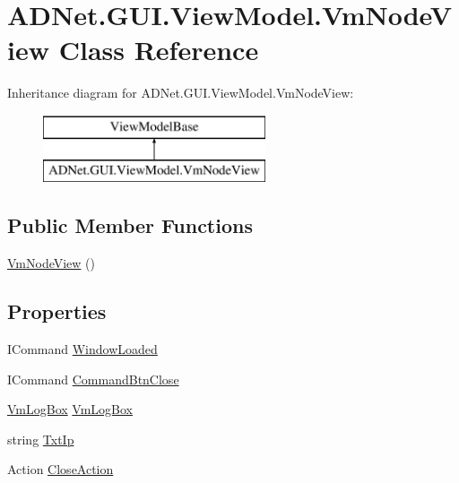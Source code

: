 \hypertarget{class_a_d_net_1_1_g_u_i_1_1_view_model_1_1_vm_node_view}{}\section{A\+D\+Net.\+G\+U\+I.\+View\+Model.\+Vm\+Node\+View Class Reference}
\label{class_a_d_net_1_1_g_u_i_1_1_view_model_1_1_vm_node_view}
Inheritance diagram for A\+D\+Net.\+G\+U\+I.\+View\+Model.\+Vm\+Node\+View\+:\begin{figure}[H]
\begin{center}
\leavevmode
\includegraphics[height=2.000000cm]{class_a_d_net_1_1_g_u_i_1_1_view_model_1_1_vm_node_view}
\end{center}
\end{figure}
\subsection*{Public Member Functions}
\begin{DoxyCompactItemize}
\item 
\hyperlink{class_a_d_net_1_1_g_u_i_1_1_view_model_1_1_vm_node_view_a3768a592cba50c559605b0ee952884ab}{Vm\+Node\+View} ()
\end{DoxyCompactItemize}
\subsection*{Properties}
\begin{DoxyCompactItemize}
\item 
I\+Command \hyperlink{class_a_d_net_1_1_g_u_i_1_1_view_model_1_1_vm_node_view_a76cc8f5fa8b2d6ccbd4a9a153f36a40c}{Window\+Loaded}
\item 
I\+Command \hyperlink{class_a_d_net_1_1_g_u_i_1_1_view_model_1_1_vm_node_view_abdfed8c3f8eec83ea7c955686ce980bd}{Command\+Btn\+Close}
\item 
\hyperlink{class_node_net_1_1_g_u_i_1_1_view_model_1_1_vm_log_box}{Vm\+Log\+Box} \hyperlink{class_a_d_net_1_1_g_u_i_1_1_view_model_1_1_vm_node_view_a4bf95508049877c7ab37bd4531c02660}{Vm\+Log\+Box}
\item 
string \hyperlink{class_a_d_net_1_1_g_u_i_1_1_view_model_1_1_vm_node_view_a1439bd95be77176b323c1d42f0caa759}{Txt\+Ip}
\item 
Action \hyperlink{class_a_d_net_1_1_g_u_i_1_1_view_model_1_1_vm_node_view_a994ae3e780d6a35e2bd4e37a4e15629c}{Close\+Action}
\end{DoxyCompactItemize}


